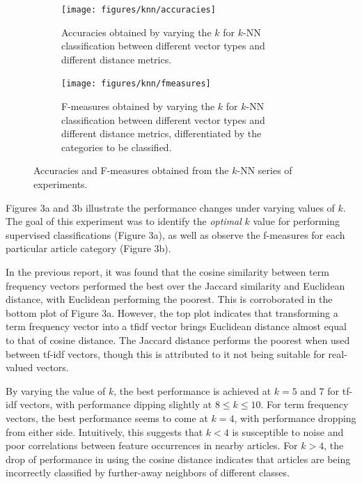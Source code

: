 \documentclass[11pt]{article}
\begin{document}
\begin{figure}[h!] \label{fig:perf_knn}
	\centering
	\begin{subfigure}{.5\textwidth}
	  \centering
	  \texttt{[image: figures/knn/accuracies]}
	  \caption{Accuracies obtained by varying the $k$ for $k$-NN\\
	   classification between different vector types and\\
	    different distance metrics.}
	  \label{fig:knn_accuracies}
	\end{subfigure}%
	\begin{subfigure}{.5\textwidth}
	  \centering
	  \texttt{[image: figures/knn/fmeasures]}
	  \caption{F-measures obtained by varying the $k$ for $k$-NN\\
	   classification between different vector types and different distance metrics, differentiated by the categories to be classified.}
	  \label{fig:knn_fmeasures}
	\end{subfigure}
	\caption{Accuracies and F-measures obtained from the $k$-NN series of experiments.}
\end{figure}

Figures 3a and 3b illustrate the performance changes under varying values of $k$.
The goal of this experiment was to identify the \emph{optimal} $k$ value for performing supervised classifications (Figure 3a), as well as observe the f-measures for each particular article category (Figure 3b).

In the previous report, it was found that the cosine similarity between term frequency vectors performed the best over the Jaccard similarity and Euclidean distance, with Euclidean performing the poorest.
This is corroborated in the bottom plot of Figure 3a.
However, the top plot indicates that transforming a term frequency vector into a tfidf vector brings Euclidean distance almost equal to that of cosine distance.
The Jaccard distance performs the poorest when used between tf-idf vectors, though this is attributed to it not being suitable for real-valued vectors.

By varying the value of $k$, the best performance is achieved at $k=5$ and $7$ for tf-idf vectors, with performance dipping slightly at $8 \le k \le 10$.
For term frequency vectors, the best performance seems to come at $k=4$, with performance dropping from either side.
Intuitively, this suggests that $k<4$ is susceptible to noise and poor correlations between feature occurrences in nearby articles.
For $k>4$, the drop of performance in using the cosine distance indicates that articles are being incorrectly classified by further-away neighbors of different classes.
\end{document}
